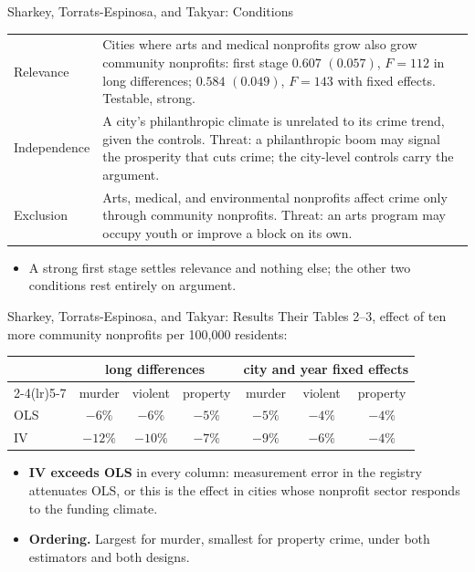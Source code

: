 \documentclass[aspectratio=169,11pt,xcolor=dvipsnames]{beamer}
\begin{document}
\begin{frame}{Sharkey, Torrats-Espinosa, and Takyar: Conditions}
\begin{center}\footnotesize
\renewcommand{\arraystretch}{1.15}
\begin{tabular}{@{}lp{10.6cm}@{}}
\toprule
Relevance & Cities where arts and medical nonprofits grow also grow
  community nonprofits: first stage $0.607$ $(0.057)$, $F = 112$ in long
  differences; $0.584$ $(0.049)$, $F = 143$ with fixed effects.
  \alert{Testable, strong.} \\
Independence & A city's philanthropic climate is unrelated to its crime
  trend, given the controls. Threat: a philanthropic boom may signal the
  prosperity that cuts crime; the city-level controls carry the argument. \\
Exclusion & Arts, medical, and environmental nonprofits affect crime only
  through community nonprofits. Threat: an arts program may occupy youth or
  improve a block on its own. \\
\bottomrule
\end{tabular}
\end{center}
\vskip2pt
\begin{itemize}\itemsep2pt
  \item A strong first stage settles relevance and nothing else; the other two
        conditions rest entirely on argument.
\end{itemize}
\end{frame}

\begin{frame}{Sharkey, Torrats-Espinosa, and Takyar: Results}
Their Tables 2--3, effect of ten more community nonprofits per 100,000 residents:
\begin{center}\small
\renewcommand{\arraystretch}{1.1}
\begin{tabular}{@{}lcccccc@{}}
\toprule
 & \multicolumn{3}{c}{long differences} & \multicolumn{3}{c}{city and year fixed effects} \\
\cmidrule(lr){2-4}\cmidrule(lr){5-7}
 & murder & violent & property & murder & violent & property \\
\midrule
OLS & $-6\%$ & $-6\%$ & $-5\%$ & $-5\%$ & $-4\%$ & $-4\%$ \\
IV  & $-12\%$ & $-10\%$ & $-7\%$ & $-9\%$ & $-6\%$ & $-4\%$ \\
\bottomrule
\end{tabular}
\end{center}
\vskip2pt
\begin{itemize}\itemsep2pt
  \item \textbf{IV exceeds OLS} in every column: measurement error in the
        registry attenuates OLS, or this is the effect in cities whose
        nonprofit sector responds to the funding climate.
  \item \textbf{Ordering.} Largest for murder, smallest for property crime,
        under both estimators and both designs.
\end{itemize}
\end{frame}
\end{document}
